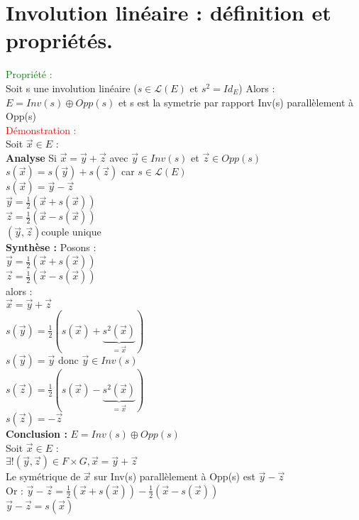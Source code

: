 \documentclass{article}
\begin{document}
\section{Involution linéaire : définition et propriétés.}
\textcolor{green}{Propriété :} \\ 
Soit s une involution linéaire ($s \in \mathcal{L}(E)$ et $s^2=Id_E$) Alors : \\ 
$E=Inv(s) \oplus Opp(s)$ et s est la symetrie par rapport Inv(s) parallèlement à Opp(s) \\ 
\textcolor{red}{Démonstration :} \\ 
Soit $\vec{x} \in E$ : \\ 
{\bf Analyse } Si $\vec{x}=\vec{y}+ \vec{z}$ avec $\vec{y} \in Inv(s)$ et $\vec{z} \in Opp(s)$ \\ 
$s(\vec{x})=s(\vec{y})+s(\vec{z})$ car $s \in \mathcal{L}(E)$ \\ 
$s(\vec{x})=\vec{y}-\vec{z}$ \\ 
$\vec{y}=\frac{1}{2}(\vec{x}+s(\vec{x}))$ \\ 
$\vec{z}=\frac{1}{2}(\vec{x}-s(\vec{x}))$ \\ 
$(\vec{y},\vec{z})$couple unique \\ 
{\bf Synthèse  :} Posons : \\  
$\vec{y}=\frac{1}{2}(\vec{x}+s(\vec{x}))$ \\ 
$\vec{z}=\frac{1}{2}(\vec{x}-s(\vec{x}))$ \\ 
alors : \\ 
$\vec{x}=\vec{y}+ \vec{z}$ \\ 
$s(\vec{y})=\frac{1}{2}(s(\vec{x})+\underbrace{s^2(\vec{x})}_{=\vec{x}})$ \\ 
$s(\vec{y})=\vec{y}$ donc $\vec{y} \in Inv(s)$ \\ 
$s(\vec{z})=\frac{1}{2}(s(\vec{x})-\underbrace{s^2(\vec{x})}_{=\vec{x}})$ \\ 
$s(\vec{z})=- \vec{z}$ \\ 
{\bf Conclusion :} $E=Inv(s) \oplus Opp(s)$ \\ 
Soit $\vec{x} \in E$ : \\ 
$\exists!(\vec{y},\vec{z}) \in F \times G, \vec{x}=\vec{y}+ \vec{z}$ \\ 
Le symétrique de $\vec{x}$ sur Inv(s) parallèlement à Opp(s) est $\vec{y}-\vec{z}$ \\ 
Or : $\vec{y}-\vec{z}=\frac{1}{2}(\vec{x}+s(\vec{x}))-\frac{1}{2}(\vec{x}-s(\vec{x}))$ \\ 
$\vec{y}-\vec{z}=s(\vec{x})$ \\ 
\end{document}
